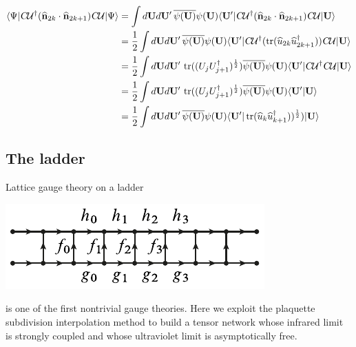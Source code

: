 \documentclass[12pt]{amsart}
\newcommand{\tr}{\operatorname{tr}}
\theoremstyle{definition}
\theoremstyle{remark}
\numberwithin{equation}{section}
\begin{document}
\begin{equation}
	\begin{split}
		\langle \Psi|\textsl{C}\mathcal{U}^\dag (\widehat{\mathbf{n}}_{2k}\cdot \widehat{\mathbf{n}}_{2k+1} )\textsl{C}\mathcal{U}|\Psi\rangle &= \int d\mathbf{U}d\mathbf{U}'\, \overline{\psi(\mathbf{U})}\psi(\mathbf{U})  \langle \mathbf{U}'|\textsl{C}\mathcal{U}^\dag (\widehat{\mathbf{n}}_{2k}\cdot \widehat{\mathbf{n}}_{2k+1} )\textsl{C}\mathcal{U}|\mathbf{U}\rangle \\
		&= \frac12\int d\mathbf{U}d\mathbf{U}'\, \overline{\psi(\mathbf{U})}\psi(\mathbf{U})  \langle \mathbf{U}'|\textsl{C}\mathcal{U}^\dag ( \tr(\widehat{u}_{2k}\widehat{u}^\dag_{2k+1}) )\textsl{C}\mathcal{U}|\mathbf{U}\rangle \\
		&= \frac12\int d\mathbf{U}d\mathbf{U}'\,  \tr((U_{j} U_{j+1}^\dag)^{\frac12} )  \overline{\psi(\mathbf{U})}\psi(\mathbf{U})  \langle \mathbf{U}'|\textsl{C}\mathcal{U}^\dag \textsl{C}\mathcal{U}|\mathbf{U}\rangle \\
		&= \frac12\int d\mathbf{U}d\mathbf{U}'\,  \tr((U_{j} U_{j+1}^\dag)^{\frac12} )  \overline{\psi(\mathbf{U})}\psi(\mathbf{U})  \langle \mathbf{U}'|\mathbf{U}\rangle \\
		&= \frac12\int d\mathbf{U}d\mathbf{U}'\,    \overline{\psi(\mathbf{U})}\psi(\mathbf{U})  \langle \mathbf{U}'|\tr(\widehat{u}_{k}\widehat{u}^\dag_{k+1}))^{\frac12} )|\mathbf{U}\rangle
	\end{split}
\end{equation}

\subsection{The ladder}
Lattice gauge theory on a ladder
\begin{center}
	\includegraphics{ymladder.pdf}
\end{center}
is one of the first nontrivial gauge theories. Here we exploit the plaquette subdivision interpolation method to build a tensor network whose infrared limit is strongly coupled and whose ultraviolet limit is asymptotically free.
\end{document}
